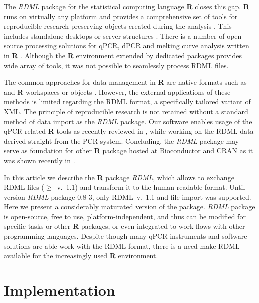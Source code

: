\documentclass{bioinfo}
\begin{document}
The \textit{RDML} package for the statistical computing language \textbf{R} 
closes this gap. \textbf{R} runs on virtually any platform and provides a 
comprehensive set of tools for reproducible research preserving objects created 
during the analysis \cite{roediger2015r,roediger2015chippcr}. This includes 
standalone desktops or server structures \cite{roediger2015r}. There is a number 
of open source processing solutions for qPCR, dPCR and melting curve analysis 
written in \textbf{R} \cite{pabinger_2014, ritz_qpcr_2008, roediger_RJ_2013, 
roediger2015chippcr}. Although the \textbf{R} environment extended by dedicated 
packages provides wide array of tools, it was not possible to seamlessly process 
RDML files.

The common approaches for data management in \textbf{R} are native formats such 
as and \textbf{R} workspaces or objects \cite{roediger_rkward_2012}. However, 
the external applications of these methods is limited regarding the RDML format, 
a specifically tailored variant of XML. The principle of reproducible research 
is not retained without a standard method of data import as the \textit{RDML} 
package. Our software enables usage of the qPCR-related \textbf{R} tools as 
recently reviewed in \cite{pabinger_2014}, while working on the RDML data 
derived straight from the PCR system. Concluding, the \textit{RDML} package may 
serve as foundation for other \textbf{R} package hosted at Bioconductor 
\cite{gentleman_2004} and CRAN as it was shown recently in \cite{roediger2015r}.

In this article we describe the \textbf{R} package \textit{RDML}, which 
allows to exchange RDML files ($\geq$~v.~1.1) and transform it to the human 
readable format. Until version \textit{RDML} package 0.8-3, only RDML~v.~1.1 and 
file import was supported. Here we present a considerably maturated version of 
the package. \textit{RDML} package is open-source, free to use, 
platform-independent, and thus can be modified for specific tasks or other 
\textbf{R} packages, or even integrated to work-flows with other programming 
languages. Despite though many qPCR instruments and software solutions are able 
work with the RDML format, there is a need make RDML available for the increasingly used \textbf{R} environment.

\section{Implementation}
	
\end{document}
